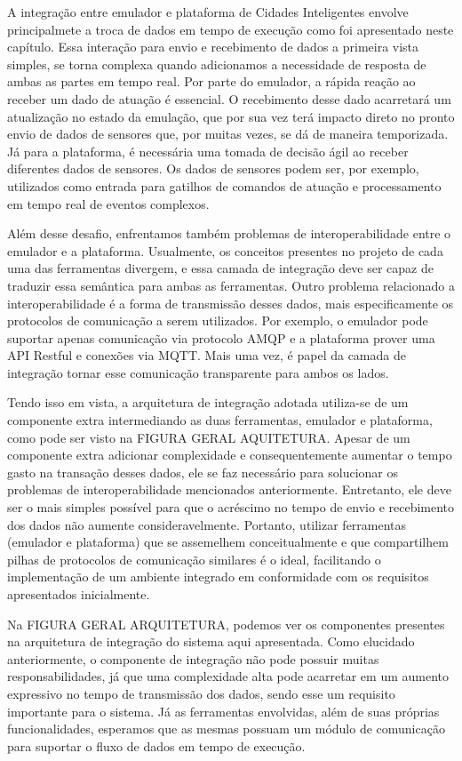 A integração entre emulador e plataforma de Cidades Inteligentes envolve principalmete a troca de dados em tempo de execução como foi apresentado neste capítulo.
Essa interação para envio e recebimento de dados a primeira vista simples, se torna complexa quando adicionamos a necessidade de resposta de ambas as partes em tempo real.
Por parte do emulador, a rápida reação ao receber um dado de atuação é essencial.
O recebimento desse dado acarretará um atualização no estado da emulação, que por sua vez terá impacto direto no pronto envio de dados de sensores que, por muitas vezes,
se dá de maneira temporizada.
Já para a plataforma, é necessária uma tomada de decisão ágil ao receber diferentes dados de sensores.
Os dados de sensores podem ser, por exemplo, utilizados como entrada para gatilhos de comandos de atuação e processamento em tempo real de eventos complexos.

Além desse desafio, enfrentamos também problemas de interoperabilidade entre o emulador e a plataforma.
Usualmente, os conceitos presentes no projeto de cada uma das ferramentas divergem, e essa camada de integração deve ser capaz de traduzir essa semântica para ambas as ferramentas.
Outro problema relacionado a interoperabilidade é a forma de transmissão desses dados, mais especificamente os protocolos de comunicação a serem utilizados.
Por exemplo, o emulador pode suportar apenas comunicação via protocolo AMQP e a plataforma prover uma API Restful e conexões via MQTT.
Mais uma vez, é papel da camada de integração tornar esse comunicação transparente para ambos os lados.

Tendo isso em vista, a arquitetura de integração adotada utiliza-se de um componente extra intermediando as duas ferramentas, emulador e plataforma, como pode ser visto na
FIGURA GERAL AQUITETURA.
Apesar de um componente extra adicionar complexidade e consequentemente aumentar o tempo gasto na transação desses dados, ele se faz necessário para solucionar os problemas
de interoperabilidade mencionados anteriormente.
Entretanto, ele deve ser o mais simples possível para que o acréscimo no tempo de envio e recebimento dos dados não aumente consideravelmente.
Portanto, utilizar ferramentas (emulador e plataforma) que se assemelhem conceitualmente e que compartilhem pilhas de protocolos de comunicação similares é o ideal,
facilitando o implementação de um ambiente integrado em conformidade com os requisitos apresentados inicialmente.

Na FIGURA GERAL ARQUITETURA, podemos ver os componentes presentes na arquitetura de integração do sistema aqui apresentada.
Como elucidado anteriormente, o componente de integração não pode possuir muitas responsabilidades, já que uma complexidade alta pode acarretar em um aumento expressivo no
tempo de transmissão dos dados, sendo esse um requisito importante para o sistema.
Já as ferramentas envolvidas, além de suas próprias funcionalidades, esperamos que as mesmas possuam um módulo de comunicação para suportar o fluxo de dados em tempo de execução.

